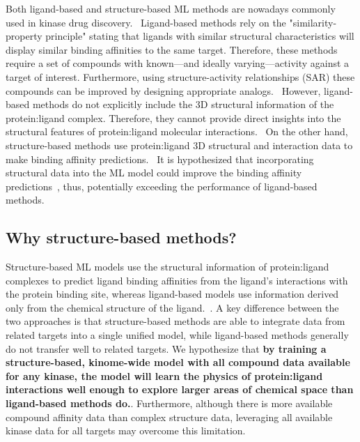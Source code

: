 \documentclass[9pt,lessons]{livecoms}
\begin{document}
Both ligand-based and structure-based ML methods are nowadays commonly used in kinase drug discovery.~\cite{sliwoski2014computational, abuhammad2016innovative, vazquez2020merging, liu2023hybrid, backenkohler2023guided, gorantla2023proteins}
Ligand-based methods rely on the "similarity-property principle" \cite{amendola2021pyrmd} stating that ligands with similar structural characteristics will display similar binding affinities to the same target. 
Therefore, these methods require a set of compounds with known---and ideally varying---activity against a target of interest. Furthermore, using structure-activity relationships (SAR) these compounds can be improved by designing appropriate analogs.~\cite{amendola2021pyrmd, chen2007evaluation, abuhammad2016innovative} %
However, ligand-based methods do not explicitly include the 3D structural information of the protein:ligand complex. Therefore, they cannot provide direct insights into the structural features of protein:ligand molecular interactions.~\cite{liu2023hybrid} On the other hand, structure-based methods use protein:ligand 3D structural and interaction data to make binding affinity predictions.~\cite{liu2023hybrid, schaller2023benchmarking} It is hypothesized that incorporating structural data into the ML model could improve the binding affinity predictions~\cite{schaller2023benchmarking, backenkohler2023guided}, thus, potentially exceeding the performance of ligand-based methods.

\subsection{Why structure-based methods?}

Structure-based ML models use the structural information of protein:ligand complexes to predict ligand binding affinities from the ligand's interactions with the protein binding site, whereas ligand-based models use information derived only from the chemical structure of the ligand.~\cite{sliwoski2014computational, sadybekov2023computational, backenkohler2023guided}. A key difference between the two approaches is that structure-based methods are able to integrate data from related targets into a single unified model, while ligand-based methods generally do not transfer well to related targets. We hypothesize that \textbf{by training a structure-based, kinome-wide model with all compound data available for any kinase, the model will learn the physics of protein:ligand interactions well enough to explore larger areas of chemical space than ligand-based methods do.}\cite{sliwoski2014computational, sadybekov2023computational}. Furthermore, although there is more available compound affinity data than complex structure data, leveraging all available kinase data for all targets may overcome this limitation.
\end{document}
